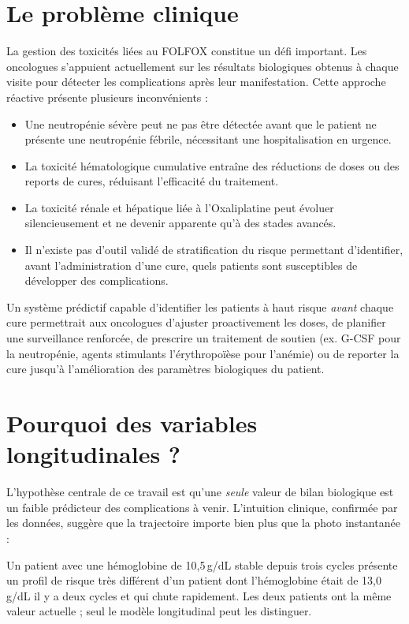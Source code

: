 \documentclass[12pt,a4paper]{report}
\begin{document}
\section{Le problème clinique}

La gestion des toxicités liées au FOLFOX constitue un défi important. Les oncologues s'appuient actuellement sur les résultats biologiques obtenus à chaque visite pour détecter les complications après leur manifestation. Cette approche réactive présente plusieurs inconvénients :
\begin{itemize}
  \item Une neutropénie sévère peut ne pas être détectée avant que le patient ne présente une neutropénie fébrile, nécessitant une hospitalisation en urgence.
  \item La toxicité hématologique cumulative entraîne des réductions de doses ou des reports de cures, réduisant l'efficacité du traitement.
  \item La toxicité rénale et hépatique liée à l'Oxaliplatine peut évoluer silencieusement et ne devenir apparente qu'à des stades avancés.
  \item Il n'existe pas d'outil validé de stratification du risque permettant d'identifier, avant l'administration d'une cure, quels patients sont susceptibles de développer des complications.
\end{itemize}

Un système prédictif capable d'identifier les patients à haut risque \emph{avant} chaque cure permettrait aux oncologues d'ajuster proactivement les doses, de planifier une surveillance renforcée, de prescrire un traitement de soutien (ex. G-CSF pour la neutropénie, agents stimulants l'érythropoïèse pour l'anémie) ou de reporter la cure jusqu'à l'amélioration des paramètres biologiques du patient.

\section{Pourquoi des variables longitudinales ?}

L'hypothèse centrale de ce travail est qu'une \emph{seule} valeur de bilan biologique est un faible prédicteur des complications à venir. L'intuition clinique, confirmée par les données, suggère que la trajectoire importe bien plus que la photo instantanée :

\begin{infobox}
Un patient avec une hémoglobine de 10,5\,g/dL stable depuis trois cycles présente un profil de risque très différent d'un patient dont l'hémoglobine était de 13,0\,g/dL il y a deux cycles et qui chute rapidement. Les deux patients ont la même valeur actuelle ; seul le modèle longitudinal peut les distinguer.
\end{infobox}
\end{document}
